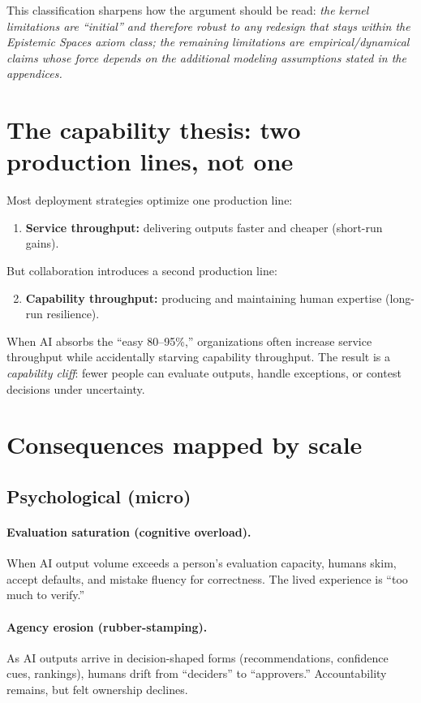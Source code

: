 \noindent This classification sharpens how the argument should be read: \emph{the kernel limitations are “initial” and therefore robust
to any redesign that stays within the Epistemic Spaces axiom class; the remaining limitations are empirical/dynamical claims whose force
depends on the additional modeling assumptions stated in the appendices.}

\section{The capability thesis: two production lines, not one}
Most deployment strategies optimize one production line:
\begin{enumerate}[label=\arabic*., leftmargin=*]
  \item \textbf{Service throughput:} delivering outputs faster and cheaper (short-run gains).
\end{enumerate}
But collaboration introduces a second production line:
\begin{enumerate}[label=\arabic*., leftmargin=*]
  \setcounter{enumi}{1}
  \item \textbf{Capability throughput:} producing and maintaining human expertise (long-run resilience).
\end{enumerate}
When AI absorbs the ``easy 80--95\%,'' organizations often increase service throughput while accidentally starving capability throughput. The result is a \emph{capability cliff}: fewer people can evaluate outputs, handle exceptions, or contest decisions under uncertainty.

\section{Consequences mapped by scale}

\subsection{Psychological (micro)}
\paragraph{Evaluation saturation (cognitive overload).}
When AI output volume exceeds a person's evaluation capacity, humans skim, accept defaults, and mistake fluency for correctness. The lived experience is ``too much to verify.''

\paragraph{Agency erosion (rubber-stamping).}
As AI outputs arrive in decision-shaped forms (recommendations, confidence cues, rankings), humans drift from ``deciders'' to ``approvers.'' Accountability remains, but felt ownership declines.

